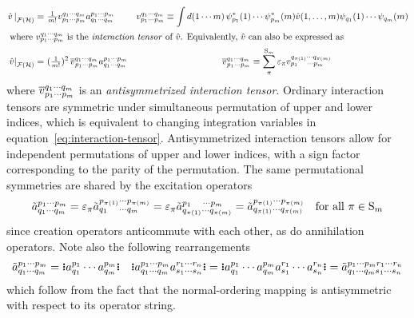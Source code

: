\documentclass[11pt]{article}
\numberwithin{equation}{section}
\begin{document}
\begin{ntt}
\begin{align}\label{eq:interaction-tensor}
  \left.
  \op{v}\,
  \right|_{\mc{F}(\mc{H})}
=&\
  \tfr{1}{m!}
  v_{p_1\cd p_m}^{q_1\cd q_m}
  a^{p_1\cd p_m}_{q_1\cd q_m}
&
  v_{p_1\cd p_m}^{q_1\cd q_m}
\equiv
  \int
  d(1\cd m)\,
  \y_{p_1}^*(1)\cd \y_{p_m}^*(m)
  \op{v}(1,\ld,m)
  \y_{q_1}(1)\cd \y_{q_m}(m)
&
\\
\intertext{
where $v_{p_1\cd p_m}^{q_1\cd q_m}$ is the \textit{interaction tensor} of $\op{v}$.
Equivalently, $\op{v}$ can also be expressed as
}
\label{eq:antisymmetrized-interaction-tensor}
  \left.
  \op{v}
  \right|_{\mc{F}(\mc{H})}
=&\
  (\tfr{1}{m!})^2\,
  \ol{v}_{p_1\cd p_m}^{q_1\cd q_m}
  a^{p_1\cd p_m}_{q_1\cd q_m}
&
  \ol{v}_{p_1\cd p_m}^{q_1\cd q_m}
\equiv
  \sum_\pi^{\mr{S}_m}
  \e_\pi
  v_{p_1\hphantom{_{\pi()}}\cd p_m}^{q_{\pi(1)}\cd q_{\pi(m)}}
\hspace{3cm}&
\end{align}
where $\overline{v}_{p_1\cdots p_m}^{q_1\cdots q_m}$ is an \textit{antisymmetrized interaction tensor}.
Ordinary interaction tensors are symmetric under simultaneous permutation of upper and lower indices, which is equivalent to changing integration variables in equation~\ref{eq:interaction-tensor}.
Antisymmetrized interaction tensors allow for independent permutations of upper and lower indices, with a sign factor corresponding to the parity of the permutation.
The same permutational symmetries are shared by the excitation operators
\begin{align}\label{eq:excitation-permutational-symmetries-1}
  \tl{a}^{p_1\cd p_m}_{q_1\cd q_m}
=
  \e_{\pi}
  \tl{a}^{p_{\pi(1)}\cd p_{\pi(m)}}_{q_1\hphantom{_{\pi()}}\cd q_m}
=
  \e_{\pi}
  \tl{a}^{p_1\hphantom{_{\pi()}}\cd p_m}_{q_{\pi(1)}\cd q_{\pi(m)}}
=
  \tl{a}^{p_{\pi(1)}\cd p_{\pi(m)}}_{q_{\pi(1)}\cd q_{\pi(m)}}
&&
  \text{for all $\pi\in\mr{S}_m$}
\end{align}
since creation operators anticommute with each other, as do annihilation operators.
Note also the following rearrangements
\begin{align}\label{eq:excitation-permutational-symmetries-2}
  \tl{a}^{p_1\cd p_m}_{q_1\cd q_m}
=
  \gno{a^{p_1}_{q_1}\cd a^{p_m}_{q_m}}
&&
  \gno{a^{p_1\cd p_m}_{q_1\cd q_m}a^{r_1\cd r_n}_{s_1\cd s_n}}
=
  \gno{a^{p_1}_{q_1}\cd a^{p_m}_{q_m}a^{r_1}_{s_1}\cd a^{r_n}_{s_n}}
=
  \tl{a}^{p_1\cd p_mr_1\cd r_n}_{q_1\cd q_ms_1\cd s_n}
\end{align}
which follow from the fact that the normal-ordering mapping is antisymmetric with respect to its operator string.
\end{ntt}
\end{document}
